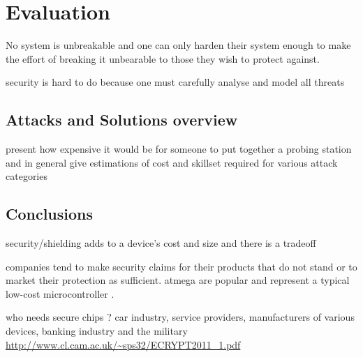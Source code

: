 \section{Evaluation}
\label{sec:conclusion}

No system is unbreakable and one can only harden their system enough to make the effort of breaking it unbearable to those they wish to protect against\citep{anderson:cautionary_note}\cite{sergei:thesis}.

security is hard to do because one must carefully analyse and model all threats \citep{kocher:DPA}
	\subsection{Attacks and Solutions overview}
	present how expensive it would be for someone to put together a probing station and in general give estimations of cost  and skillset required for various attack categories
	\subsection{Conclusions}

security/shielding adds to a device's cost and size \citep{kocher:DPA} and there is a tradeoff \citep{sergei:thesis}


companies tend to make security claims for their products that do not stand or to market their protection as sufficient\citep{sergei:thesis}. atmega are popular and represent a typical low-cost microcontroller \citep{glitches_paper}. 

who needs secure chips ? car industry, service providers, manufacturers of various devices, banking industry and the military \url{http://www.cl.cam.ac.uk/~sps32/ECRYPT2011_1.pdf}